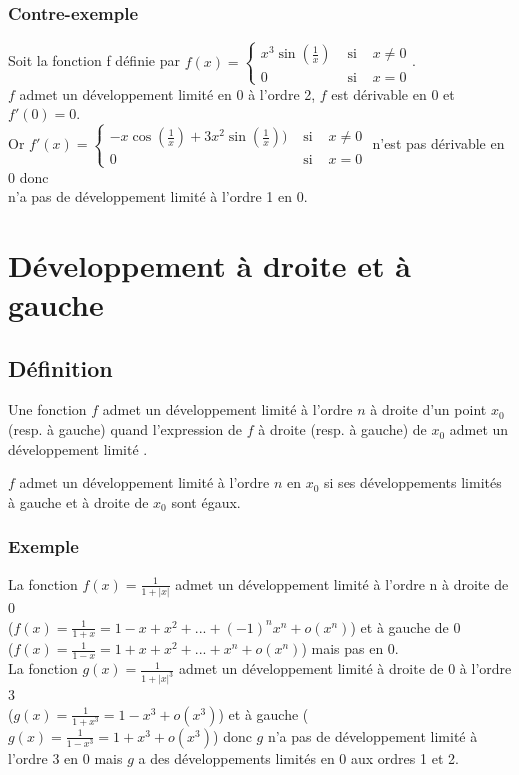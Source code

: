 \documentclass[a4paper,10pt]{book} %
\newcommand{\dl}{développement limité }
\newcommand{\abs}[1]{\left|#1\right|}
\newcommand{\dls}{développements limités }
\begin{document}
\subsubsection{Contre-exemple}
Soit la fonction f définie par $f(x)=\left\{\begin{array}{ccl}
x^3\sin(\frac{1}{x}) &\text{ si }& x\neq 0 \\
0 &\text{ si }& x=0
\end{array}\right.$.\\

$f$ admet un \dl en 0 à l'ordre 2, $f$ est dérivable en 0 et $f'(0)=0$.\\

Or $f'(x)=\left\{\begin{array}{rcl}
-x\cos(\frac{1}{x})+3x^2\sin(\frac{1}{x})) &\text{ si }& x\neq 0\\ 0 &\text{ si }& x=0
\end{array}\right.$ n'est pas dérivable en 0 donc\\
n'a pas de \dl à l'ordre 1 en 0.

\section{Développement à droite et à gauche}
\subsection{Définition}
Une fonction $f$ admet un \dl à l'ordre $n$ à droite d'un point $x_0$ (resp. à gauche) quand l'expression de $f$ à droite (resp. à gauche) de $x_0$ admet un \dl.

$f$ admet un \dl à l'ordre $n$ en $x_0$ si ses \dls à gauche et à droite de $x_0$ sont égaux.

\subsubsection{Exemple}
La fonction $f(x)=\frac{1}{1+\abs{x}}$ admet un \dl à l'ordre n à droite de 0\\ ($f(x)=\frac{1}{1+x}=1-x+x^2+...+(-1)^nx^n+o(x^n)$) et à gauche de 0\\
($f(x)=\frac{1}{1-x}=1+x+x^2+...+x^n+o(x^n)$) mais pas en 0.\\

La fonction $g(x)=\frac{1}{1+\abs{x}^3}$ admet un \dl à droite de 0 à l'ordre 3\\($g(x)=\frac{1}{1+x^3}=1-x^3+o(x^3)$) et à gauche ($g(x)=\frac{1}{1-x^3}=1+x^3+o(x^3)$) donc $g$ n'a pas de \dl à l'ordre 3 en 0 mais $g$ a des \dls en 0 aux ordres 1 et 2.
\end{document}
